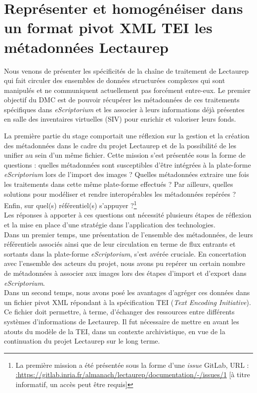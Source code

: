 \part{Représenter et homogénéiser dans un format pivot XML TEI les métadonnées Lectaurep}\label{partie_2}

Nous venons de présenter les spécificités de la chaîne de traitement de Lectaurep qui fait circuler des ensembles de données structurées complexes qui sont manipulés et ne communiquent actuellement pas forcément entre-eux. Le premier objectif du DMC est de pouvoir récupérer les métadonnées de ces traitements spécifiques dans \textit{eScriptorium} et les associer à leurs informations déjà présentes en salle des inventaires virtuelles (SIV) pour enrichir et valoriser leurs fonds.

La première partie du stage comportait une réflexion sur la gestion et la création des métadonnées dans le cadre du projet Lectaurep et de la possibilité de les unifier au sein d'un même fichier. Cette mission s'est présentée sous la forme de questions : quelles métadonnées sont susceptibles d'être intégrées à la plate-forme \textit{eScriptorium} lors de l'import des images ? Quelles métadonnées extraire une fois les traitements dans cette même plate-forme effectués ? Par ailleurs, quelles solutions pour modéliser et rendre interopérables les  métadonnées repérées ? Enfin, sur quel(s) référentiel(s) s'appuyer ?\footnote{La première mission a été présentée sous la forme d'une \textit{issue} GitLab, URL : \url{:https://gitlab.inria.fr/almanach/lectaurep/documentation/-/issues/1} [à titre informatif, un accès peut être requis]}\\

Les réponses à apporter à ces questions ont nécessité plusieurs étapes de réflexion et la mise en place d'une stratégie dans l'application des technologies.\\

Dans un premier temps, une présentation de l'ensemble des métadonnées, de leurs référentiels associés ainsi que de leur circulation en terme de flux entrants et sortants dans la plate-forme \textit{eScriptorium}, s'est avérée cruciale. En concertation avec l'ensemble des acteurs du projet, nous avons pu repérer un certain nombre de métadonnées à associer aux images lors des étapes d'import et d'export dans \textit{eScriptorium}.\\

Dans un second temps, nous avons posé les avantages d'agréger ces données dans un fichier pivot XML répondant à la spécification TEI (\textit{Text Encoding Initiative}). Ce fichier doit permettre, à terme, d'échanger des ressources entre différents systèmes d'informations de Lectaurep. Il fut nécessaire de mettre en avant les atouts du modèle de la TEI, dans un contexte archivistique, en vue de la continuation du projet Lectaurep sur le long terme.\\ 

